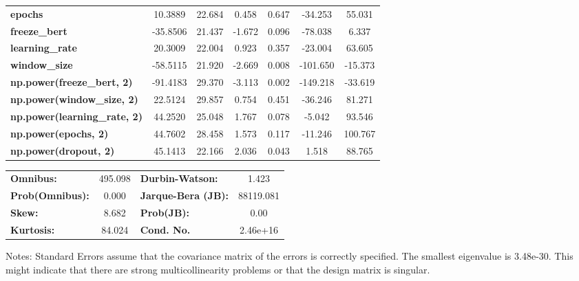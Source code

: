 \begin{center}
\begin{tabular}{lcccccc}
\textbf{epochs}                            &      10.3889  &       22.684     &     0.458  &         0.647        &      -34.253    &       55.031     \\
\textbf{freeze\_bert}                      &     -35.8506  &       21.437     &    -1.672  &         0.096        &      -78.038    &        6.337     \\
\textbf{learning\_rate}                    &      20.3009  &       22.004     &     0.923  &         0.357        &      -23.004    &       63.605     \\
\textbf{window\_size}                      &     -58.5115  &       21.920     &    -2.669  &         0.008        &     -101.650    &      -15.373     \\
\textbf{np.power(freeze\_bert, 2)}         &     -91.4183  &       29.370     &    -3.113  &         0.002        &     -149.218    &      -33.619     \\
\textbf{np.power(window\_size, 2)}         &      22.5124  &       29.857     &     0.754  &         0.451        &      -36.246    &       81.271     \\
\textbf{np.power(learning\_rate, 2)}       &      44.2520  &       25.048     &     1.767  &         0.078        &       -5.042    &       93.546     \\
\textbf{np.power(epochs, 2)}               &      44.7602  &       28.458     &     1.573  &         0.117        &      -11.246    &      100.767     \\
\textbf{np.power(dropout, 2)}              &      45.1413  &       22.166     &     2.036  &         0.043        &        1.518    &       88.765     \\
\bottomrule
\end{tabular}
\begin{tabular}{lclc}
\textbf{Omnibus:}       & 495.098 & \textbf{  Durbin-Watson:     } &     1.423  \\
\textbf{Prob(Omnibus):} &   0.000 & \textbf{  Jarque-Bera (JB):  } & 88119.081  \\
\textbf{Skew:}          &   8.682 & \textbf{  Prob(JB):          } &      0.00  \\
\textbf{Kurtosis:}      &  84.024 & \textbf{  Cond. No.          } &  2.46e+16  \\
\bottomrule
\end{tabular}
\end{center}

Notes: \newline
 [1] Standard Errors assume that the covariance matrix of the errors is correctly specified. \newline
 [2] The smallest eigenvalue is 3.48e-30. This might indicate that there are \newline
 strong multicollinearity problems or that the design matrix is singular.